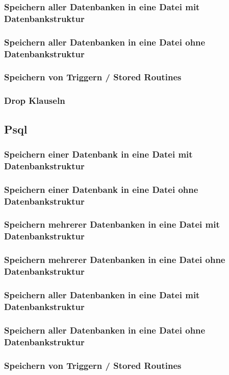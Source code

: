 \documentclass[10pt]{article}
\begin{document}
\subsubsection{Speichern aller Datenbanken in eine Datei mit Datenbankstruktur}
\subsubsection{Speichern aller Datenbanken in eine Datei ohne Datenbankstruktur}
\subsubsection{Speichern von Triggern / Stored Routines}
\subsubsection{Drop Klauseln}

\subsection{Psql}
\subsubsection{Speichern einer Datenbank in eine Datei mit Datenbankstruktur}
\subsubsection{Speichern einer Datenbank in eine Datei ohne Datenbankstruktur}
\subsubsection{Speichern mehrerer Datenbanken in eine Datei mit Datenbankstruktur}
\subsubsection{Speichern mehrerer Datenbanken in eine Datei ohne Datenbankstruktur}
\subsubsection{Speichern aller Datenbanken in eine Datei mit Datenbankstruktur}
\subsubsection{Speichern aller Datenbanken in eine Datei ohne Datenbankstruktur}
\subsubsection{Speichern von Triggern / Stored Routines}
\end{document}
